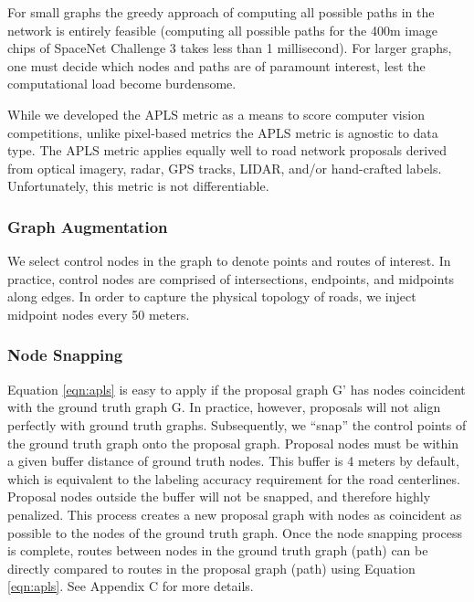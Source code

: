 \documentclass{article}
\begin{document}
For small graphs the greedy approach of computing all possible paths in the network is entirely feasible 
(computing all possible paths for the 400m image chips of SpaceNet Challenge 3 takes less than 1 millisecond). 
For larger graphs, one must decide which nodes and paths are of paramount interest, lest the computational load become burdensome. 


While we developed the APLS metric as a means to score computer vision competitions, unlike pixel-based metrics the APLS metric is agnostic to data type.  The APLS metric applies equally well to road network proposals derived from optical imagery, radar, GPS tracks, LIDAR, and/or hand-crafted labels.  Unfortunately, this metric is not differentiable.

\subsubsection{Graph Augmentation}

We select control nodes in the graph to denote points and routes of interest.
In practice, control nodes are comprised of intersections, endpoints, and midpoints along edges.  In order to capture the physical topology of roads, we inject midpoint nodes every 50 meters.  


\subsubsection{Node Snapping}\label{sec:node_snap}

Equation \ref{eqn:apls} is easy to apply if the proposal graph G' has nodes coincident with the ground truth graph G. In practice, however, proposals will not align perfectly with ground truth graphs. Subsequently, we ``snap'' the control points of the ground truth graph onto the proposal graph. Proposal nodes must be within a given buffer distance of ground truth nodes.  This buffer is 4 meters by default, which is equivalent to the labeling accuracy requirement for the road centerlines.  Proposal nodes outside the buffer will not be snapped, and therefore highly penalized.  This process creates a new proposal graph with nodes as coincident as possible to the nodes of the ground truth graph.  Once the node snapping process is complete, routes between nodes in the ground truth graph (path) can be directly compared to routes in the proposal graph (path) using Equation \ref{eqn:apls}.
See Appendix C for more details.
\end{document}
